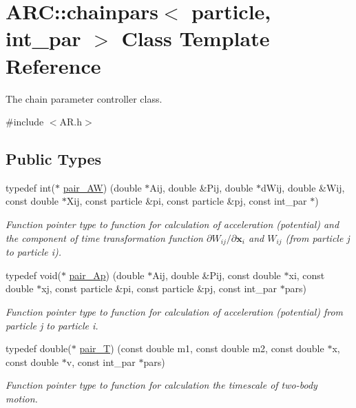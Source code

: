 \hypertarget{classARC_1_1chainpars}{}\section{A\+RC\+:\+:chainpars$<$ particle, int\+\_\+par $>$ Class Template Reference}
\label{classARC_1_1chainpars}


The chain parameter controller class.  




{\ttfamily \#include $<$A\+R.\+h$>$}

\subsection*{Public Types}
\begin{DoxyCompactItemize}
\item 
typedef int($\ast$ \hyperlink{classARC_1_1chainpars_a766866c2e38b475767a4f8529624a378}{pair\+\_\+\+AW}) (double $\ast$Aij, double \&Pij, double $\ast$d\+Wij, double \&Wij, const double $\ast$Xij, const particle \&pi, const particle \&pj, const int\+\_\+par $\ast$)
\begin{DoxyCompactList}\small\item\em Function pointer type to function for calculation of acceleration (potential) and the component of time transformation function $\partial W_{ij}/\partial \mathbf{x}_i$ and $W_{ij}$ (from particle j to particle i). \end{DoxyCompactList}\item 
typedef void($\ast$ \hyperlink{classARC_1_1chainpars_aa34d083090c50f572d2126262e169474}{pair\+\_\+\+Ap}) (double $\ast$Aij, double \&Pij, const double $\ast$xi, const double $\ast$xj, const particle \&pi, const particle \&pj, const int\+\_\+par $\ast$pars)
\begin{DoxyCompactList}\small\item\em Function pointer type to function for calculation of acceleration (potential) from particle j to particle i. \end{DoxyCompactList}\item 
typedef double($\ast$ \hyperlink{classARC_1_1chainpars_a343fccd377d7215a4af2e909f3f9acf6}{pair\+\_\+T}) (const double m1, const double m2, const double $\ast$x, const double $\ast$v, const int\+\_\+par $\ast$pars)
\begin{DoxyCompactList}\small\item\em Function pointer type to function for calculation the timescale of two-\/body motion. \end{DoxyCompactList}\end{DoxyCompactItemize}

